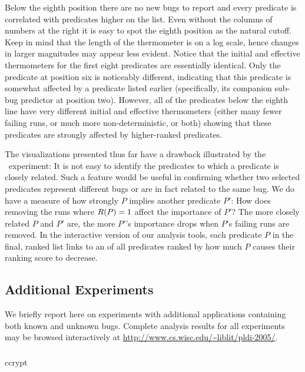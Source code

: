 Below the eighth position there are no new bugs to report and every
predicate is correlated with predicates higher on the list.  Even
without the columns of numbers at the right it is easy to spot the
eighth position as the natural cutoff.  Keep in mind that the length
of the thermometer is on a log scale, hence changes in larger
magnitudes may appear less evident.  Notice that the initial and
effective thermometers for the first eight predicates are essentially
identical.  Only the predicate at position six is noticeably
different, indicating that this predicate is somewhat affected by a
predicate listed earlier (specifically, its companion sub-bug
predictor at position two).  However, all of the predicates below the
eighth line have very different initial and effective thermometers
(either many fewer failing runs, or much more non-deterministic, or
both) showing that these predicates are strongly affected by
higher-ranked predicates.

The visualizations presented thus far have a drawback illustrated by
the \moss\ experiment: It is not easy to identify the predicates to
which a predicate is closely related.  Such a feature would be useful
in confirming whether two selected predicates represent different bugs
or are in fact related to the same bug.  We do have a measure of how
strongly $P$ implies another predicate $P'$: How does removing the
runs where $R(P) = 1$ affect the importance of $P'$?  The more
closely related $P$ and $P'$ are, the more $P'$'s importance drops
when $P$'s failing runs are removed.  In the interactive version of
our analysis tools, each predicate $P$ in the final, ranked list
links to an  of all
predicates ranked by how much $P$ causes their ranking score to
decrease.

\subsection{Additional Experiments}

We briefly report here on experiments with additional applications
containing both known and unknown bugs.  Complete analysis results for
all experiments may be browsed interactively at
\url{http://www.cs.wisc.edu/~liblit/pldi-2005/}.

\subsubsection{\ccrypt}

\begin{view}{\ccrypt}{ccrypt}
  
\end{view}

